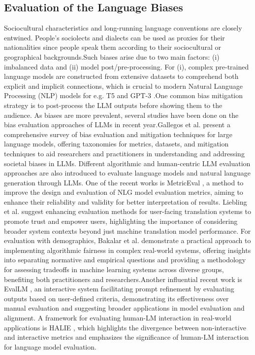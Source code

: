 \subsection{Evaluation of the Language Biases}
Sociocultural characteristics and long-running language conventions are closely entwined. People’s
sociolects and dialects can be used as proxies for their nationalities since people speak them
according to their sociocultural or geographical backgrounds.Such biases\cite{Wasi2024BengaliBiases} arise due to two
main factors: (i) imbalanced data and (ii) model post/pre-processing. For (i), complex pre-trained
language models are constructed from extensive datasets to comprehend both explicit and implicit connections, which is crucial to modern Natural Language Processing (NLP) models  for e.g. T5 and GPT-3 .One common bias mitigation strategy is to post-process the LLM outputs before showing them
to the audience. As biases are more prevalent, several studies have been done on the bias evaluation approaches of LLMs in recent year.Gallegos et al.\cite{Wasi2024BengaliBiases} present a comprehensive survey of bias evaluation and mitigation techniques for large language models, offering taxonomies for metrics, datasets, and mitigation techniques to aid researchers and practitioners in understanding and addressing societal biases in LLMs. Different algorithmic and human-centric LLM evaluation approaches are also introduced to evaluate language models and natural language generation through LLMs. One of the recent works is MetricEval , a method to improve the design and evaluation of NLG model evaluation metrics, aiming to enhance their reliability and validity for better interpretation of results. Liebling et al. suggest enhancing evaluation methods for user-facing translation systems to promote trust and empower users,
highlighting the importance of considering broader system contexts beyond just machine translation model performance. For evaluation with demographics, Bakalar et al.  demonstrate a practical approach to implementing algorithmic fairness in complex real-world systems, offering insights into separating normative and empirical questions and providing a methodology for assessing tradeoffs in machine learning systems across diverse groups, benefiting both practitioners and researchers.Another influential recent work is EvalLM , an interactive system facilitating prompt refinement by evaluating outputs based on user-defined criteria, demonstrating its effectiveness over manual
evaluation and suggesting broader applications in model evaluation and alignment. A framework
for evaluating human-LM interaction in real-world applications is HALIE , which highlights the divergence between non-interactive and interactive metrics and emphasizes the significance of human-LM interaction for language model evaluation.
 

 


